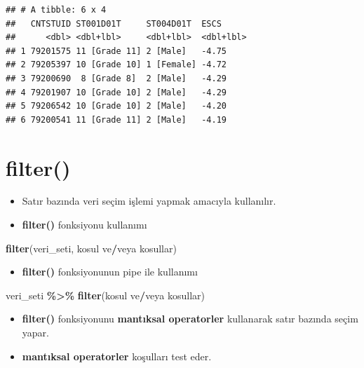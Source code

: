 \documentclass[
  oneside]{book}
\newenvironment{Shaded}{\begin{snugshade}}{\end{snugshade}}
\newcommand{\FunctionTok}[1]{\textcolor[rgb]{0.13,0.29,0.53}{\textbf{#1}}}
\newcommand{\NormalTok}[1]{#1}
\newcommand{\SpecialCharTok}[1]{\textcolor[rgb]{0.81,0.36,0.00}{\textbf{#1}}}
\providecommand{\tightlist}{%
  \setlength{\itemsep}{0pt}\setlength{\parskip}{0pt}}
\begin{document}
\begin{verbatim}
## # A tibble: 6 x 4
##   CNTSTUID ST001D01T     ST004D01T  ESCS     
##      <dbl> <dbl+lbl>     <dbl+lbl>  <dbl+lbl>
## 1 79201575 11 [Grade 11] 2 [Male]   -4.75    
## 2 79205397 10 [Grade 10] 1 [Female] -4.72    
## 3 79200690  8 [Grade 8]  2 [Male]   -4.29    
## 4 79201907 10 [Grade 10] 2 [Male]   -4.29    
## 5 79206542 10 [Grade 10] 2 [Male]   -4.20    
## 6 79200541 11 [Grade 11] 2 [Male]   -4.19
\end{verbatim}

\hypertarget{filter}{%
\section{\texorpdfstring{\textbf{filter()}}{filter()}}\label{filter}}

\begin{itemize}
\item
  Satır bazında veri seçim işlemi yapmak amacıyla kullanılır.
\item
  \textbf{filter()} fonksiyonu kullanımı
\end{itemize}

\begin{Shaded}
\begin{Highlighting}[]
\FunctionTok{filter}\NormalTok{(veri\_seti, kosul ve}\SpecialCharTok{/}\NormalTok{veya kosullar)}
\end{Highlighting}
\end{Shaded}

\begin{itemize}
\tightlist
\item
  \textbf{filter()} fonksiyonunun pipe ile kullanımı
\end{itemize}

\begin{Shaded}
\begin{Highlighting}[]
\NormalTok{veri\_seti }\SpecialCharTok{\%\textgreater{}\%} \FunctionTok{filter}\NormalTok{(kosul ve}\SpecialCharTok{/}\NormalTok{veya kosullar)}
\end{Highlighting}
\end{Shaded}

\begin{itemize}
\item
  \textbf{filter()} fonksiyonunu \textbf{mantıksal operatorler} kullanarak satır bazında seçim yapar.
\item
  \textbf{mantıksal operatorler} koşulları test eder.
\end{itemize}
\end{document}
